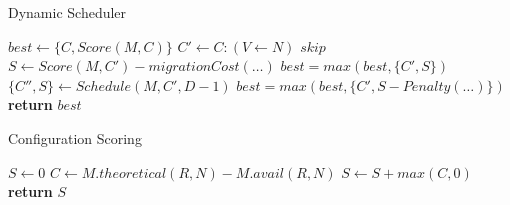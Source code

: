 
\begin{algorithm}[h]
\caption{Dynamic Scheduler}
\label{algo:sched}
\footnotesize
\begin{algorithmic}[1]
    \State $best \gets \{C,Score(M,C)\}$%
        \State $C' \gets C : (V \gets N)$
            \State $skip$
        \EndIf
        \State $S \gets Score(M,C') - migrationCost(\dots)$
        \State $best = max(best,\{C',S\})$
        \State $\{C'',S\} \gets Schedule(M,C',D-1)$
        \State $best = max(best,\{C', S - Penalty(\dots)\})$
        \EndIf
    \EndFor
    \State \textbf{return} $best$
\EndProcedure
\end{algorithmic}
\normalsize
\end{algorithm}

\begin{algorithm}[h]
\caption{Configuration Scoring}
\label{algo:score}
\footnotesize
\begin{algorithmic}[1]
    \State $S \gets 0$
        \State $C \gets M.theoretical(R,N) - M.avail(R,N)$
        \State $S \gets S + max(C,0)$ \label{algo:scoremax}
    \EndFor
    \State \textbf{return} $S$
\EndProcedure
\end{algorithmic}
\normalsize
\end{algorithm}
